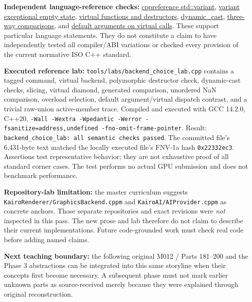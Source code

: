 \textbf{Independent language-reference checks:} \href{https://en.cppreference.com/w/cpp/utility/variant}{cppreference std::variant}, \href{https://en.cppreference.com/w/cpp/utility/variant/valueless_by_exception}{variant exceptional empty state}, \href{https://en.cppreference.com/w/cpp/language/virtual}{virtual functions and destructors}, \href{https://en.cppreference.com/w/cpp/language/dynamic_cast}{dynamic\_cast}, \href{https://en.cppreference.com/w/cpp/language/operator_comparison}{three-way comparisons}, and \href{https://en.cppreference.com/w/cpp/language/default_arguments}{default arguments on virtual calls}. These support particular language statements. They do not constitute a claim to have independently tested all compiler/ABI variations or checked every provision of the current normative ISO C++ standard.

\textbf{Executed reference lab:} \texttt{tools/labs/backend\_choice\_lab.cpp} contains a tagged command, virtual backend, polymorphic destructor check, dynamic-cast checks, slicing, virtual diamond, generated comparison, unordered NaN comparison, overload selection, default argument/virtual dispatch contrast, and a trivial raw-union active-member trace. Compiled and executed with GCC 14.2.0, C++20, \texttt{-Wall\ -Wextra\ -Wpedantic\ -Werror\ -fsanitize=address,undefined\ -fno-omit-frame-pointer}. Result: \texttt{backend\_choice\_lab:\ all\ semantic\ checks\ passed}. The committed file's 6,431-byte text matched the locally executed file's FNV-1a hash \texttt{0x22332ec3}. Assertions test representative behavior; they are not exhaustive proof of all standard corner cases. The test performs no actual GPU submission and does not benchmark performance.

\textbf{Repository-lab limitation:} the master curriculum suggests \texttt{KairoRenderer/GraphicsBackend.cppm} and \texttt{KairoAI/AIProvider.cppm} as concrete anchors. Those separate repositories and exact revisions were \emph{not} inspected in this pass. The new prose and lab therefore do not claim to describe their current implementations. Future code-grounded work must check real code before adding named claims.

\textbf{Next teaching boundary:} the following original M012 / Parts 181--200 and the Phase 3 abstractions can be integrated into this same storyline when their concepts first become necessary. A subsequent phase must not mark earlier unknown parts as source-received merely because they were explained through original reconstruction.

